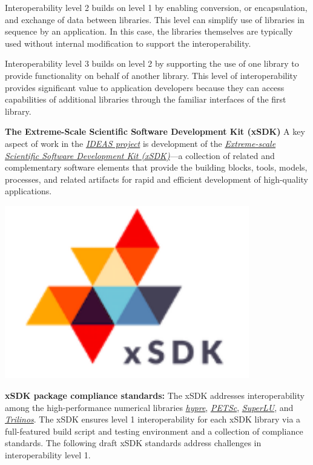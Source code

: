 \documentclass[]{article}
\begin{document}
Interoperability level 2 builds on level 1 by enabling conversion, or
encapsulation, and exchange of data between libraries. This level can
simplify use of libraries in sequence by an application. In this case,
the libraries themselves are typically used without internal
modification to support the interoperability.

Interoperability level 3 builds on level 2 by supporting the use of one
library to provide functionality on behalf of another library. This
level of interoperability provides significant value to application
developers because they can access capabilities of additional libraries
through the familiar interfaces of the first library.

\begin{minipage}{0.75\textwidth}

\textbf{The Extreme-Scale Scientific Software Development Kit (xSDK)}
A key aspect of work in the
\href{https://ideas-productivity.org/}{\emph{IDEAS project}} is
development of the \href{http://xsdk.info}{\emph{Extreme-scale
Scientific Software Development Kit (xSDK)}}---a collection of related
and complementary software elements that provide the building blocks,
tools, models, processes, and related artifacts for rapid and efficient
development of high-quality applications.
\end{minipage}
\begin{minipage}{0.3\textwidth}\raggedleft
\includegraphics[width=0.8\textwidth]{xsdk}\raggedleft
\end{minipage}

\textbf{xSDK package compliance standards:} The xSDK addresses
interoperability among the high-performance numerical libraries
\href{https://computation.llnl.gov/project/linear_solvers/}{\emph{hypre}},
\href{https://www.mcs.anl.gov/petsc/}{\emph{PETSc}},
\href{http://crd.lbl.gov/~xiaoye/SuperLU/}{\emph{SuperLU}}, and
\href{https://trilinos.org/}{\emph{Trilinos}}. The xSDK ensures level 1
interoperability for each xSDK library via a full-featured build script
and testing environment and a collection of compliance standards. The
following draft xSDK standards address challenges in interoperability
level 1.
\end{document}
